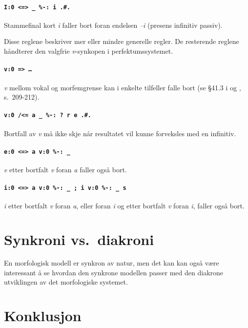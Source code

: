 \documentclass{article}
\begin{document}
\paragraph{\texttt{I:0 <=> \_ \%-: i .\#.}} Stammefinal kort \emph{i} faller
bort foran endelsen \emph{--i} (presens infinitiv passiv).

Disse reglene beskriver mer eller mindre generelle regler. De resterende
reglene h\aa{}ndterer den valgfrie \emph{v}-synkopen i perfektumssystemet.

\paragraph{\texttt{v:0 => \ldots}} \emph{v} mellom vokal og morfemgrense kan i
enkelte tilfeller falle bort (se \S 41.3 i  og ,
s.~209-212).

\paragraph{\texttt{v:0 /<= a \_ \%-: ? r e .\#.}} Bortfall av \emph{v} m\aa{}
ikke skje n\aa{}r resultatet vil kunne forveksles med en infinitiv.

\paragraph{\texttt{e:0 <=> a v:0 \%-: \_}} \emph{e} etter bortfalt \emph{v}
foran \emph{a} faller ogs\aa{} bort.

\paragraph{\texttt{i:0 <=> a v:0 \%-: \_ ; i v:0 \%-: \_ s}} \emph{i} etter
bortfalt \emph{v} foran \emph{a}, eller foran \emph{i} og etter bortfalt
\emph{v} foran \emph{i}, faller ogs\aa{} bort.

\section{Synkroni vs.~diakroni}
En morfologisk modell er synkron av natur, men det kan kan ogs\aa{} v\ae{}re
interessant \aa{} se hvordan den synkrone modellen passer med den diakrone
utviklingen av det morfologiske systemet.

\section{Konklusjon} %

\clearpage

{}
\end{document}
